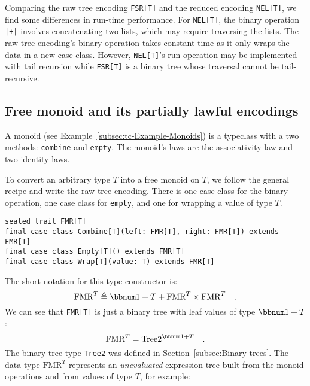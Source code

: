Comparing the raw tree encoding \lstinline!FSR[T]!
and the reduced encoding \lstinline!NEL[T]!,
we find some differences in run-time performance. For \lstinline!NEL[T]!,
the binary operation \lstinline!|+|!
involves concatenating two lists, which may require traversing the
lists. The raw tree encoding\textsf{'}s binary operation takes constant time
as it only wraps the data in a new case class. However, \lstinline!NEL[T]!\textsf{'}s
run operation may be implemented with tail recursion while \lstinline!FSR[T]!
is a binary tree whose traversal cannot be tail-recursive.

\subsection{Free monoid and its partially lawful encodings\label{subsec:Free-monoids}}

A monoid (see Example~\ref{subsec:tc-Example-Monoids}) is a typeclass
with a two methods: \lstinline!combine!
and \lstinline!empty!.
The monoid\textsf{'}s laws are the associativity law and two identity laws.

To convert an arbitrary type $T$ into a free monoid on $T$, we follow
the general recipe and write the raw tree encoding. There is one case
class for the binary operation, one case class for \lstinline!empty!,
and one for wrapping a value of type $T$.
\begin{lstlisting}
sealed trait FMR[T]
final case class Combine[T](left: FMR[T], right: FMR[T]) extends FMR[T]
final case class Empty[T]() extends FMR[T]
final case class Wrap[T](value: T) extends FMR[T]
\end{lstlisting}
The short notation for this type constructor is:
\[
\text{FMR}^{T}\triangleq\bbnum 1+T+\text{FMR}^{T}\times\text{FMR}^{T}\quad.
\]
We can see that \lstinline!FMR[T]!
is just a binary tree with leaf values of type $\bbnum 1+T$:
\[
\text{FMR}^{T}=\text{Tree2}^{\bbnum 1+T}\quad.
\]
The binary tree type \lstinline!Tree2!
was defined in Section~\ref{subsec:Binary-trees}. The data type
$\text{FMR}^{T}$ represents an \emph{unevaluated} expression tree
built from the monoid operations and from values of type $T$, for
example:

